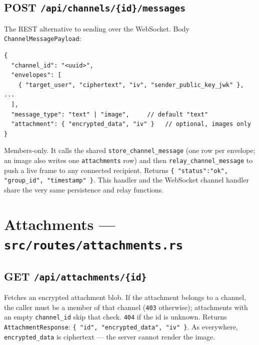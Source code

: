 \subsection*{POST \texttt{/api/channels/\{id\}/messages}}
The REST alternative to sending over the WebSocket. Body
\verb|ChannelMessagePayload|:

\begin{lstlisting}
{
  "channel_id": "<uuid>",
  "envelopes": [
    { "target_user", "ciphertext", "iv", "sender_public_key_jwk" }, ...
  ],
  "message_type": "text" | "image",     // default "text"
  "attachment": { "encrypted_data", "iv" }   // optional, images only
}
\end{lstlisting}

Members-only. It calls the shared \verb|store_channel_message| (one row per
envelope; an image also writes one \verb|attachments| row) and then
\verb|relay_channel_message| to push a live frame to any connected recipient.
Returns \verb|{ "status":"ok", "group_id", "timestamp" }|. This handler and the
WebSocket channel handler share the very same persistence and relay functions.

\section{Attachments --- \texttt{src/routes/attachments.rs}}

\subsection*{GET \texttt{/api/attachments/\{id\}}}
Fetches an encrypted attachment blob. If the attachment belongs to a channel, the
caller must be a member of that channel (\verb|403| otherwise); attachments with
an empty \verb|channel_id| skip that check. \verb|404| if the id is unknown.
Returns \verb|AttachmentResponse|: \verb|{ "id", "encrypted_data", "iv" }|. As
everywhere, \verb|encrypted_data| is ciphertext --- the server cannot render the
image.
